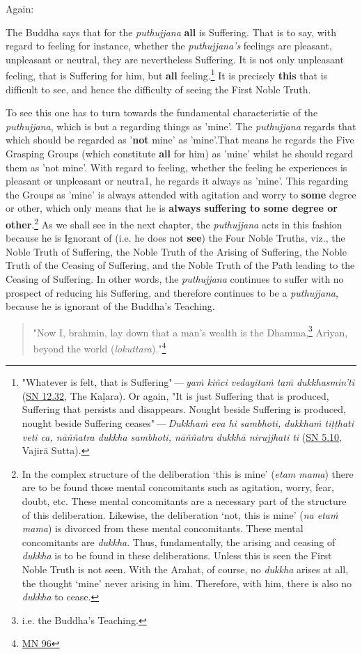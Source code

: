 Again:

The Buddha says that for the \emph{puthujjana} \textbf{all} is Suffering. That is to say, with regard to feeling for instance, whether the \emph{puthujjana's} feelings are pleasant, unpleasant or neutral, they are nevertheless Suffering. It is not only unpleasant feeling, that is Suffering for him, but \textbf{all} feeling.\footnote{"Whatever is felt, that is Suffering" --- \emph{yaṁ kiñci vedayitaṁ taṁ dukkhasmin'ti} (\href{https://suttacentral.net/sn12.32/en/bodhi}{SN 12.32}, The Kaḷara). Or again, "It is just Suffering that is produced, Suffering that persists and disappears. Nought beside Suffering is produced, nought beside Suffering ceases" --- \emph{Dukkhaṁ eva hi sambhoti, dukkhaṁ tiṭṭhati veti ca, nāññatra dukkha sambhoti, nāññatra dukkhā nirujjhati ti} (\href{https://suttacentral.net/sn5.10/en/bodhi}{SN 5.10}, Vajirā Sutta).} It is precisely \textbf{this} that is difficult to see, and hence the difficulty of seeing the First Noble Truth.

To see this one has to turn towards the fundamental characteristic of the \emph{puthujjana}, which is but a regarding things as 'mine'. The \emph{puthujjana} regards that which should be regarded as '\textbf{not} mine' as 'mine'.That means he regards the Five Grasping Groups (which constitute \textbf{all} for him) as 'mine' whilst he should regard them as 'not mine'. With regard to feeling, whether the feeling he experiences is pleasant or unpleasant or neutra1, he regards it always as 'mine'. This regarding the Groups as 'mine' is always attended with agitation and worry to \textbf{some} degree or other, which only means that he is \textbf{always suffering to some degree or other}.\footnote{In the complex structure of the deliberation `this is mine' (\emph{etam mama}) there are to be found those mental concomitants such as agitation, worry, fear, doubt, etc. These mental concomitants are a necessary part of the structure of this deliberation. Likewise, the deliberation `not, this is mine' (\emph{na etaṁ mama}) is divorced from these mental concomitants. These mental concomitants are \emph{dukkha}. Thus, fundamentally, the arising and ceasing of \emph{dukkha} is to be found in these deliberations. Unless this is seen the First Noble Truth is not seen. With the Arahat, of course, no \emph{dukkha} arises at all, the thought `mine' never arising in him. Therefore, with him, there is also no \emph{dukkha} to cease.} As we shall see in the next chapter, the \emph{puthujjana} acts in this fashion because he is Ignorant of (i.e. he does not \textbf{see}) the Four Noble Truths, viz., the Noble Truth of Suffering, the Noble Truth of the Arising of Suffering, the Noble Truth of the Ceasing of Suffering, and the Noble Truth of the Path leading to the Ceasing of Suffering. In other words, the \emph{puthujjana} continues to suffer with no prospect of reducing his Suffering, and therefore continues to be a \emph{puthujjana}, because he is ignorant of the Buddha's Teaching.

\begin{quote}
"Now I, brahmin, lay down that a man's wealth is the Dhamma,\footnote{i.e. the Buddha's Teaching.} Ariyan, beyond the world (\emph{lokuttara})."\footnote{\href{https://suttacentral.net/mn96/en/sujato}{MN 96}}
\end{quote}
